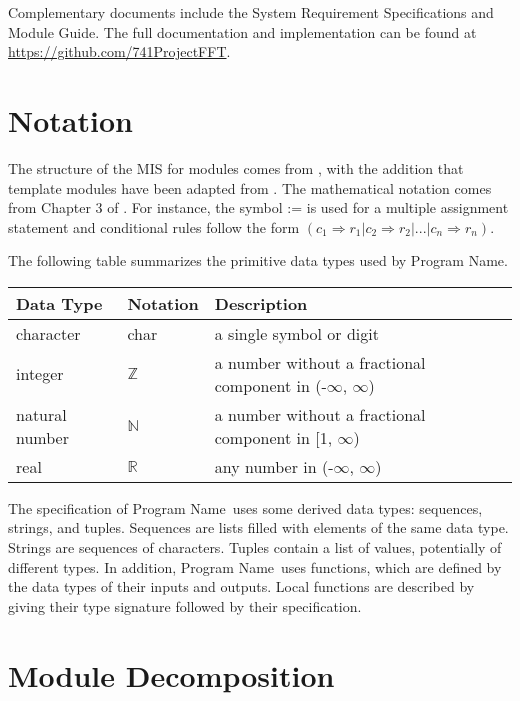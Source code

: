 \documentclass[12pt, titlepage]{article}
\newcommand{\progname}{Program Name}
\begin{document}
Complementary documents include the System Requirement Specifications
and Module Guide.  The full documentation and implementation can be
found at \url{https://github.com/741ProjectFFT}. 

\section{Notation}


The structure of the MIS for modules comes from \citet{HoffmanAndStrooper1995},
with the addition that template modules have been adapted from
\cite{GhezziEtAl2003}.  The mathematical notation comes from Chapter 3 of
\citet{HoffmanAndStrooper1995}.  For instance, the symbol := is used for a
multiple assignment statement and conditional rules follow the form $(c_1
\Rightarrow r_1 | c_2 \Rightarrow r_2 | ... | c_n \Rightarrow r_n )$.

The following table summarizes the primitive data types used by \progname. 

\begin{center}
\renewcommand{\arraystretch}{1.2}
\noindent 
\begin{tabular}{l l p{7.5cm}} 
\toprule 
\textbf{Data Type} & \textbf{Notation} & \textbf{Description}\\ 
\midrule
character & char & a single symbol or digit\\
integer & $\mathbb{Z}$ & a number without a fractional component in (-$\infty$, $\infty$) \\
natural number & $\mathbb{N}$ & a number without a fractional component in [1, $\infty$) \\
real & $\mathbb{R}$ & any number in (-$\infty$, $\infty$)\\
\bottomrule
\end{tabular} 
\end{center}

\noindent
The specification of \progname \ uses some derived data types: sequences, strings, and
tuples. Sequences are lists filled with elements of the same data type. Strings
are sequences of characters. Tuples contain a list of values, potentially of
different types. In addition, \progname \ uses functions, which
are defined by the data types of their inputs and outputs. Local functions are
described by giving their type signature followed by their specification.

\section{Module Decomposition}
\end{document}
